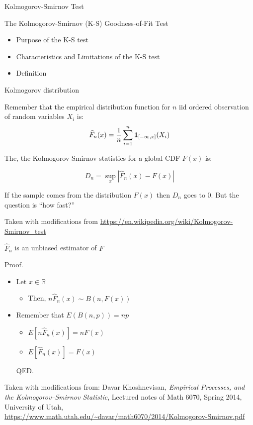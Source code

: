 \documentclass{beamer}
\begin{document}
\begin{frame}
{\centerline{Kolmogorov-Smirnov Test}}
The Kolmogorov-Smirnov (K-S) Goodness-of-Fit Test
\begin{itemize}
\item Purpose of the K-S test
\item Characteristics and Limitations of the K-S test
\item Definition
\end{itemize}

\end{frame}


\begin{frame}
{\centerline{Kolmogorov distribution}}

Remember that the empirical distribution function for $n$ iid ordered observation of random variables $X_i$ is:
$$ \widehat {F}_{n}(x)={1 \over n}\sum _{i=1}^{n}\mathbf {1}_{[-\infty ,x]}(X_{i})$$

The, the Kolmogorov Smirnov statistics for a global CDF $F(x)$ is:

$$D_{n}=\sup _{x}|\widehat {F}_{n}(x)-F(x)|$$

If the sample comes from the distribution $F(x)$ then $D_n$ goes to 0. But the question is ``how fast?'' 

\begin{center}
\tiny{Taken with modifications from \url{https://en.wikipedia.org/wiki/Kolmogorov-Smirnov_test}}
\end{center}

\end{frame}


\begin{frame}
{\centerline{$\widehat {F}_{n}$ is an unbiased estimator of $F$}}

Proof.
\begin{itemize}
\item Let $x \in \mathbb{R}$
\begin{itemize}
\item Then, $n \widehat {F}_{n} (x) \sim B(n,F(x))$
\end{itemize}
\item Remember that $E(B(n,p))=np$
\begin{itemize}
\item  $E[n \widehat {F}_{n} (x)] = n F(x)$ 
\item  $E[\widehat {F}_{n} (x)] = F(x)$
\end{itemize}
QED.

\end{itemize}


\begin{center}
\tiny{Taken with modifications from: Davar Khoshnevisan, \textit{Empirical Processes, and the Kolmogorov–Smirnov Statistic}, Lectured notes of Math 6070, Spring 2014, University of Utah, \url{https://www.math.utah.edu/~davar/math6070/2014/Kolmogorov-Smirnov.pdf}}
\end{center}

\end{frame}
\end{document}
